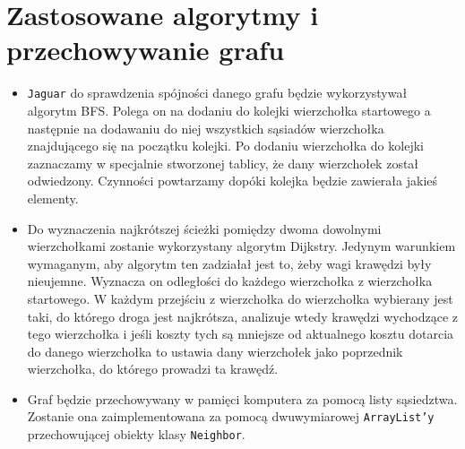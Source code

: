 \documentclass[]{article}
\begin{document}
\section{Zastosowane algorytmy i przechowywanie grafu}\label{header-n233}
\begin{itemize}
\item
\texttt{Jaguar} do sprawdzenia spójności danego grafu będzie wykorzystywał algorytm BFS. Polega on na dodaniu do kolejki wierzchołka startowego a następnie na dodawaniu do niej wszystkich sąsiadów wierzchołka znajdującego się na początku kolejki. Po dodaniu wierzchołka do kolejki zaznaczamy w specjalnie stworzonej tablicy, że dany wierzchołek został odwiedzony. Czynności powtarzamy dopóki kolejka będzie zawierała jakieś elementy.
\item
Do wyznaczenia najkrótszej ścieżki pomiędzy dwoma dowolnymi wierzchołkami zostanie wykorzystany algorytm Dijkstry. Jedynym warunkiem wymaganym, aby algorytm ten zadziałał jest to, żeby wagi krawędzi były nieujemne. Wyznacza on odległości do każdego wierzchołka z wierzchołka startowego. W każdym przejściu z wierzchołka do wierzchołka wybierany jest taki, do którego droga jest najkrótsza, analizuje wtedy krawędzi wychodzące z tego wierzchołka i jeśli koszty tych są mniejsze od aktualnego kosztu dotarcia do danego wierzchołka to ustawia dany wierzchołek jako poprzednik wierzchołka, do którego prowadzi ta krawędź.
\item
Graf będzie przechowywany w pamięci komputera za pomocą listy sąsiedztwa. Zostanie ona zaimplementowana za pomocą dwuwymiarowej \texttt{ArrayList'y} przechowującej obiekty klasy \texttt{Neighbor}.

\end{itemize}
\end{document}
